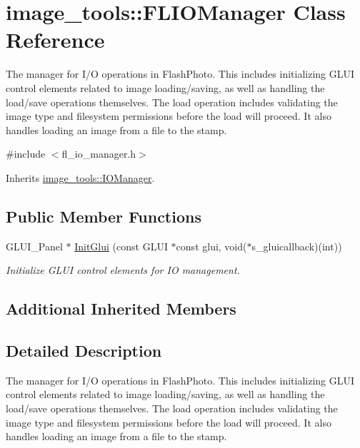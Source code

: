 \hypertarget{classimage__tools_1_1FLIOManager}{}\section{image\+\_\+tools\+:\+:F\+L\+I\+O\+Manager Class Reference}
\label{classimage__tools_1_1FLIOManager}


The manager for I/O operations in Flash\+Photo. This includes initializing G\+L\+UI control elements related to image loading/saving, as well as handling the load/save operations themselves. The load operation includes validating the image type and filesystem permissions before the load will proceed. It also handles loading an image from a file to the stamp.  




{\ttfamily \#include $<$fl\+\_\+io\+\_\+manager.\+h$>$}



Inherits \hyperlink{classimage__tools_1_1IOManager}{image\+\_\+tools\+::\+I\+O\+Manager}.

\subsection*{Public Member Functions}
\begin{DoxyCompactItemize}
\item 
G\+L\+U\+I\+\_\+\+Panel $\ast$ \hyperlink{classimage__tools_1_1FLIOManager_affcec03afe5552940ab4d79a07324248}{Init\+Glui} (const G\+L\+UI $\ast$const glui, void($\ast$s\+\_\+gluicallback)(int))
\begin{DoxyCompactList}\small\item\em Initialize G\+L\+UI control elements for IO management. \end{DoxyCompactList}\end{DoxyCompactItemize}
\subsection*{Additional Inherited Members}


\subsection{Detailed Description}
The manager for I/O operations in Flash\+Photo. This includes initializing G\+L\+UI control elements related to image loading/saving, as well as handling the load/save operations themselves. The load operation includes validating the image type and filesystem permissions before the load will proceed. It also handles loading an image from a file to the stamp. 


